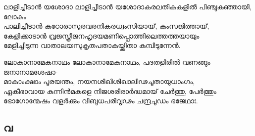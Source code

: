 \begin{enumerate}

\begin{slokam}{\VSr}{\VKG}{ലാളിച്ചീടാൻ യശോദാ}
 ലാളിച്ചീടാൻ യശോദാകരലതികകളിൽ പിഞ്ചുകുഞ്ഞായി, ലോകം\\
പാലിച്ചീടാൻ കഠോരാസുരവരനികരധ്വംസിയായ്‌, കംസജിത്തായ്‌,\\
കേളിക്കാടാൻ വ്രജസ്ത്രീജനഹൃദയമണിപ്പൊത്തിലെത്തത്തയായും\\
മേളിച്ചീടുന്ന വാതാലയസുകൃതപതാകയ്ക്കിതാ കുമ്പിടുന്നേൻ.
\end{slokam}



\begin{slokam}{\VSr}{\Unk}{ലോകാനാമേകനാഥം}
ലോകാനാമേകനാഥം, പദതളിരിൽ വണങ്ങും ജനാനാമശേഷാ-\\
മാകാംക്ഷാം പൂരയന്തം, നയനശിഖിശിഖാലീഢചൂതായുധാംഗം,\\
ഏകീഭാവായ കുന്നിൻമകളെ നിജശരീരാർദ്ധമായ്‌ ചേർത്തു, പേർത്തും\\
ഭോഗോന്മേഷം വളർക്കും വിബുധപരിവൃഢം ചന്ദ്രചൂഡം ഭജേഥാഃ.
\end{slokam}





\end{enumerate}

\subsection{വ}

